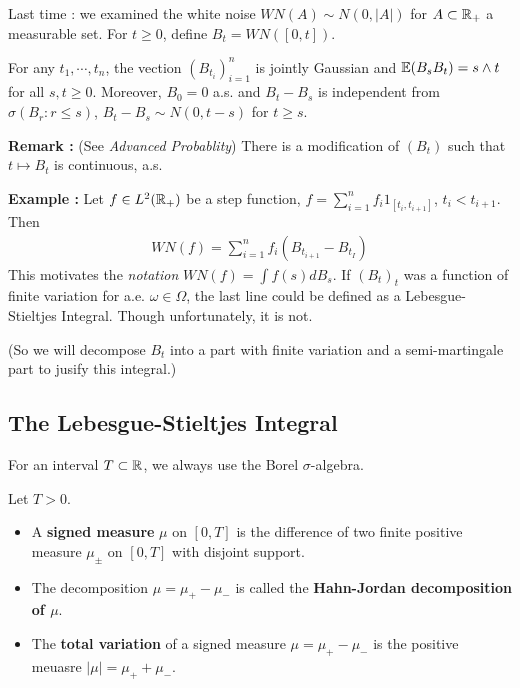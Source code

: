 \documentclass[12pt,a4paper]{article}
\renewenvironment{i}
{\begin{itemize} 
	}%
	{\end{itemize}
}
\begin{document}
Last time : we examined the white noise $WN(A)\sim N(0, |A|)$ for $A\subset \mathbb{R}_+$ a measurable set. For $t\geq 0$, define $B_t = WN([0, t])$.
\s

\fact For any $t_1, \cdots, t_n$, the vection $(B_{t_i})_{i=1}^n$ is jointly Gaussian and $\mathbb{E}(B_s B_t) = s\wedge t$ for all $s,t\geq 0$. Moreover, $B_0 =0$ a.s. and $B_t -B_s$ is independent from $\sigma(B_r : r\leq s)$, $B_t - B_s \sim N(0, t-s)$ for $t\geq s$.
\s

\textbf{Remark :} (See \emph{Advanced Probablity}) There is a modification of $(B_t)$ such that $t\mapsto B_t$ is continuous, a.s.
\s

\textbf{Example :} Let $f\in L^2(\mathbb{R}_+)$ be a step function, $f = \sum_{i=1}^n f_i 1_{[t_i, t_{i+1}]}$, $t_i < t_{i+1}$. Then
\begin{align*}
WN(f) = \sum_{i=1}^n f_i (B_{t_{i+1}} - B_{t_I})
\end{align*}
This motivates the \emph{notation} $WN(f)  = \int f(s)dB_s$. If $(B_t)_t$ was a function of finite variation for a.e. $\omega \in \Omega$, the last line could be defined as a Lebesgue-Stieltjes Integral. Though unfortunately, it is not.

\quad (So we will decompose $B_t$ into a part with finite variation and a semi-martingale part to jusify this integral.)

\subsection{The Lebesgue-Stieltjes Integral}

For an interval $T\subset \mathbb{R}$, we always use the Borel $\sigma$-algebra.
\s

 Let $T>0$.
\begin{i}
\item A \textbf{signed measure} $\mu$ on $[0, T]$ is the difference of two finite positive measure $\mu_{\pm}$ on $[0, T]$ with disjoint support.
\item The decomposition $\mu = \mu_+ - \mu_-$ is called the \textbf{Hahn-Jordan decomposition of $\mu$}.
\item The \textbf{total variation} of a signed measure $\mu = \mu_+ - \mu_-$ is the positive meuasre $|\mu| = \mu_+ + \mu_-$.
\end{i}
\s
\end{document}

